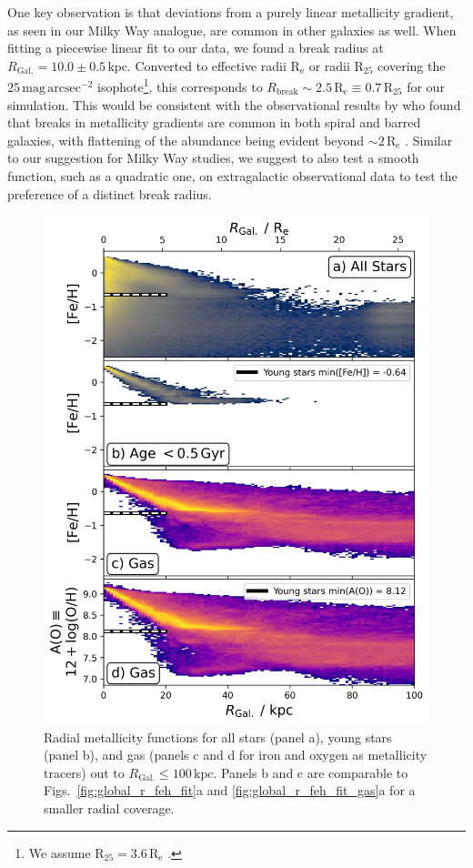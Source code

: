 \documentclass[fleqn,usenatbib]{mnras}
\begin{document}
One key observation is that deviations from a purely linear metallicity gradient, as seen in our Milky Way analogue, are common in other galaxies as well. When fitting a piecewise linear fit to our data, we found a break radius at $R_\mathrm{Gal.} = 10.0 \pm 0.5\,\mathrm{kpc}$. Converted to effective radii $\mathrm{R_e}$ or radii $\mathrm{R_{25}}$ covering the $25\,\mathrm{mag\,arcsec^{-2}}$ isophote\footnote{We assume $\mathrm{R_{25}} = 3.6\,\mathrm{R_e}$ \citep{Williams2009, Chen2023}.}, this corresponds to $R_\mathrm{break} \sim 2.5\,\mathrm{R_e} \equiv 0.7\,\mathrm{R_{25}}$ for our simulation. This would be consistent with the observational results by \citet{Sanchez2014} who found that breaks in metallicity gradients are common in both spiral and barred galaxies, with flattening of the abundance being evident beyond $\sim 2\,\mathrm{R_e}$ \citep[compare also to][]{Belfiore2017}. Similar to our suggestion for Milky Way studies, we suggest to also test a smooth function, such as a quadratic one, on extragalactic observational data \citep[e.g.][]{Bresolin2012, Chen2023} to test the preference of a distinct break radius.

\begin{figure}
    \centering
    \includegraphics[width=\columnwidth]{figures/trace_stars_and_gas_100kpc.png}
    \caption{Radial metallicity functions for all stars (panel a), young stars (panel b), and gas (panels c and d for iron and oxygen as metallicity tracers) out to $R_\mathrm{Gal.} \leq 100\,\mathrm{kpc}$. Panels b and c are comparable to Figs.~\ref{fig:global_r_feh_fit}a and \ref{fig:global_r_feh_fit_gas}a for a smaller radial coverage.}
    \label{fig:trace_stars_and_gas_100kpc}
\end{figure}
\end{document}
